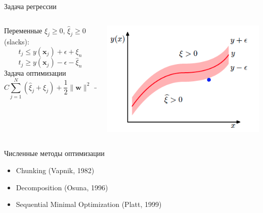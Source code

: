 \documentclass[aspectratio=169]{beamer}
\begin{document}
\begin{frame}{Задача регрессии}

\begin{columns}[T]
    \begin{column}{.51\textwidth}
    
    Переменные $\xi_j \geq 0$, $\hat \xi_j \geq 0$ (slacks):
    \[
    t_j \leq y(\mathbf{x}_j) + \epsilon + \xi_n
    \]
     \[
    t_j \geq y(\mathbf{x}_j) - \epsilon - \hat \xi_n
    \]
    Задача оптимизации
    \[
    C \sum_{j=1}^N (\hat \xi_j + \xi_j) + \frac{1}{2}\|\mathbf{w}\|^2 \rightarrow \min_{\mathbf{w}, b}
    \]    
	
    \end{column}
       
    \begin{column}{.5\textwidth}
    	\vspace{0em}
		\begin{center}
   			\includegraphics[scale=0.45]{images/regression.png}
    	\end{center}
	\end{column}
\end{columns}

\end{frame}

\begin{frame}{Численные методы оптимизации}

\begin{itemize}
\item Chunking (Vapnik, 1982)
\item Decomposition (Osuna, 1996)
\item Sequential Minimal Optimization (Platt, 1999)
\end{itemize}

\end{frame}

\end{document}
